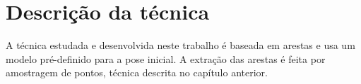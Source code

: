 \chapter{Descrição da técnica}

A técnica estudada e desenvolvida neste trabalho é baseada em arestas e usa um modelo pré-definido para a pose inicial. A extração das arestas é feita por amostragem de pontos, técnica descrita no capítulo anterior.

